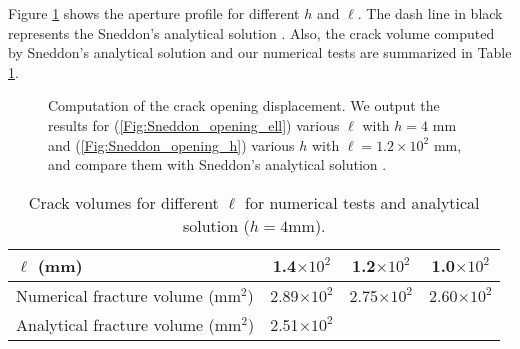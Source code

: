 Figure \ref{Fig:Sneddon_opening} shows the {aperture} profile for different $h$ and $\ell$. The dash line in black represents the Sneddon's analytical solution \cite{SneddonLowengrub69}. Also, the crack volume computed by Sneddon's analytical solution and our numerical tests are summarized in Table \ref{Tab:Sneddon_volume}. %

\begin{figure}[htbp]
    \centering
    \caption{Computation of the crack opening displacement. We output the results for (\ref{Fig:Sneddon_opening_ell}) various $\ell$ with $h=4$ mm and (\ref{Fig:Sneddon_opening_h}) various $h$ with $\ell=1.2\times 10^{2}$ mm, and compare them with Sneddon's analytical solution \cite{SneddonLowengrub69}.}
    \label{Fig:Sneddon_opening}
\end{figure}


\begin{table}[]
    \centering
    \caption{Crack volumes for different $\ell$ for numerical tests and analytical solution ($h=4\text{mm}$).}
    \begin{tabular}{l  c c c}
    \hline 
         $\ell$ (mm)  &1.4$\times 10^{2}$ & 1.2$\times 10^{2}$ &1.0$\times 10^{2}$\\
    \hline 
         Numerical fracture volume (mm$^2$) & 2.89$\times 10^{2}$ & 2.75$\times 10^{2}$  & 2.60$\times 10^{2}$\\
         Analytical fracture volume (mm$^2$) &2.51$\times 10^{2}$\\
    \hline      
    \end{tabular}
    \label{Tab:Sneddon_volume}
\end{table}